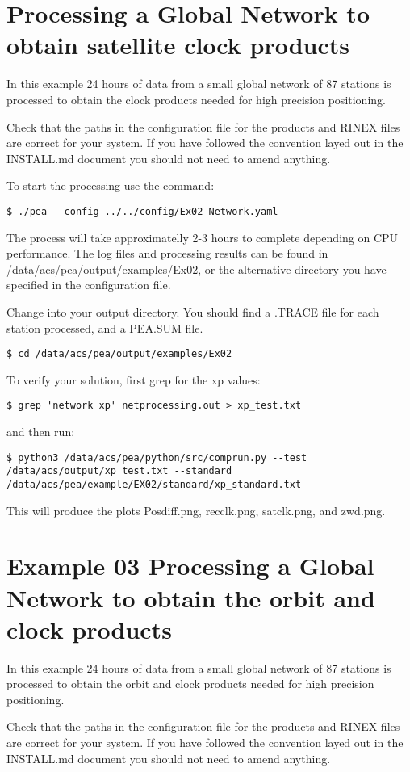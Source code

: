 
\section{Processing a Global Network to obtain satellite clock products}
In this example 24 hours of data from a small global network of 87 stations is processed to obtain the clock products needed for high precision positioning.

Check that the paths in the configuration file for the products and RINEX files are correct for your system. If you have followed the convention layed out in the INSTALL.md document you should not need to amend anything.

To start the processing use the command:
\begin{verbatim}
$ ./pea --config ../../config/Ex02-Network.yaml
\end{verbatim}
The process will take approximatelly 2-3 hours to complete depending on CPU performance. The log files and processing results can be found in /data/acs/pea/output/examples/Ex02, or the alternative directory you have specified in the configuration file.

Change into your output directory. You should find a .TRACE file for each station processed, and a PEA.SUM file.
\begin{verbatim}
$ cd /data/acs/pea/output/examples/Ex02
\end{verbatim}
To verify your solution, first grep for the xp values:
\begin{verbatim}
$ grep 'network xp' netprocessing.out > xp_test.txt
\end{verbatim}
and then run:
\begin{verbatim}
$ python3 /data/acs/pea/python/src/comprun.py --test /data/acs/output/xp_test.txt --standard /data/acs/pea/example/EX02/standard/xp_standard.txt
\end{verbatim}
This will produce the plots Posdiff.png, recclk.png, satclk.png, and zwd.png.

\section{Example 03 Processing a Global Network to obtain the orbit and clock products}
In this example 24 hours of data from a small global network of 87 stations is processed to obtain the orbit and clock products needed for high precision positioning.

Check that the paths in the configuration file for the products and RINEX files are correct for your system. If you have followed the convention layed out in the INSTALL.md document you should not need to amend anything.

